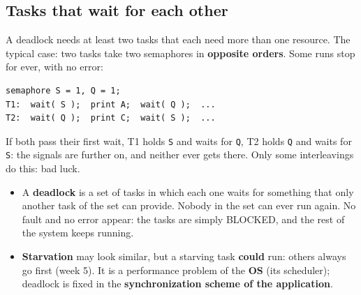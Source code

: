 \subsection{Tasks that wait for each other}
A deadlock needs at least two tasks that each need more than one resource. The typical case: two tasks take two semaphores in \textbf{opposite orders}. Some runs stop for ever, with no error:
\begin{lstlisting}[basicstyle=\ttfamily\footnotesize]
semaphore S = 1, Q = 1;
T1:  wait( S );  print A;  wait( Q );  ...
T2:  wait( Q );  print C;  wait( S );  ...
\end{lstlisting}
If both pass their first wait, T1 holds \texttt{S} and waits for \texttt{Q}, T2 holds \texttt{Q} and waits for \texttt{S}: the signals are further on, and neither ever gets there. Only some interleavings do this: bad luck.
\begin{itemize}
    \item A \textbf{deadlock} is a set of tasks in which each one waits for something that only another task of the set can provide. Nobody in the set can ever run again. No fault and no error appear: the tasks are simply BLOCKED, and the rest of the system keeps running.
    \item \textbf{Starvation} may look similar, but a starving task \textbf{could} run: others always go first (week 5). It is a performance problem of the \textbf{OS} (its scheduler); deadlock is fixed in the \textbf{synchronization scheme of the application}.
\end{itemize}

